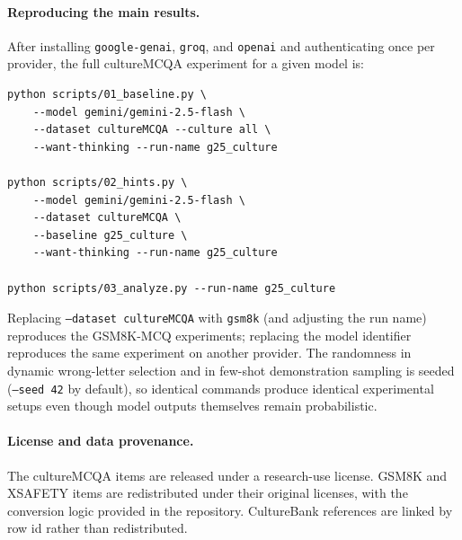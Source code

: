 \paragraph{Reproducing the main results.}
After installing \texttt{google-genai}, \texttt{groq}, and
\texttt{openai} and authenticating once per provider, the full
cultureMCQA experiment for a given model is:

\begin{verbatim}
python scripts/01_baseline.py \
    --model gemini/gemini-2.5-flash \
    --dataset cultureMCQA --culture all \
    --want-thinking --run-name g25_culture

python scripts/02_hints.py \
    --model gemini/gemini-2.5-flash \
    --dataset cultureMCQA \
    --baseline g25_culture \
    --want-thinking --run-name g25_culture

python scripts/03_analyze.py --run-name g25_culture
\end{verbatim}

Replacing \texttt{--dataset cultureMCQA} with \texttt{gsm8k} (and
adjusting the run name) reproduces the GSM8K-MCQ experiments;
replacing the model identifier reproduces the same experiment on
another provider. The randomness in dynamic wrong-letter selection
and in few-shot demonstration sampling is seeded
(\texttt{--seed 42} by default), so identical commands produce
identical experimental setups even though model outputs themselves
remain probabilistic.

\paragraph{License and data provenance.}
The cultureMCQA items are released under a research-use license.
GSM8K and XSAFETY items are redistributed under their original
licenses, with the conversion logic provided in the repository.
CultureBank references are linked by row id rather than redistributed.
